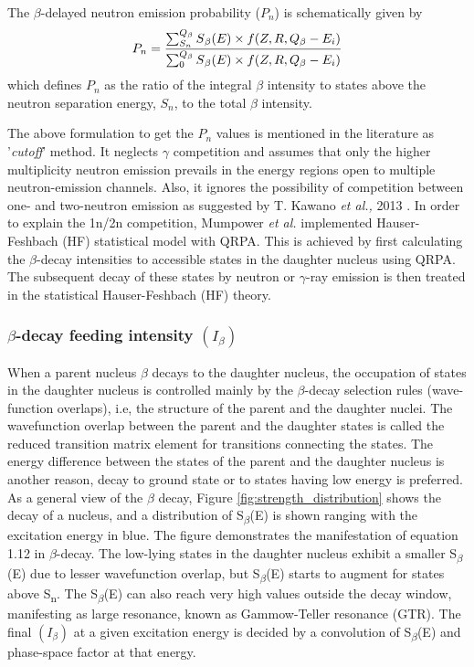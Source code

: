 The $\beta$-delayed neutron emission probability ($P_{n}$) is schematically given by 
\begin{equation}
P_{n}=\frac{\sum_{S_{n}}^{Q_{\beta}} S\textsubscript{$\beta$}(E)\times f(Z,R,Q_{\beta}-E_{i})}{\sum_{0}^{Q_{\beta}} S\textsubscript{$\beta$}(E)\times f(Z,R,Q_{\beta}-E_{i})}
\end{equation}
which defines $P_{n}$ as the ratio of the integral $\beta$ intensity to states above the neutron separation energy, $S_{n}$, to the total $\beta$ intensity. 

The above formulation to get the $P_{n}$ values is mentioned in the literature as '\textit{cutoff}' method. It neglects $\gamma$ competition and assumes that only the higher multiplicity neutron emission prevails in the energy regions open to multiple neutron-emission channels. Also, it ignores the possibility of competition between one- and two-neutron emission as suggested by T. Kawano \textit{et al.,} 2013 \citep{kwano2013}. In order to explain the 1n/2n competition, Mumpower \textit{et al.} \citep{moller2016} implemented Hauser-Feshbach (HF) statistical model with QRPA. This is achieved by first calculating the $\beta$-decay intensities to accessible states in the daughter nucleus using QRPA. The subsequent decay of these states by neutron or $\gamma$-ray emission is then treated in the statistical Hauser-Feshbach (HF) theory. 


\subsubsection{$\beta$-decay feeding intensity $(I_{\beta})$}
When a parent nucleus $\beta$ decays to the daughter nucleus, the occupation of states in the daughter nucleus is controlled mainly by the $\beta$-decay selection rules (wave-function overlaps), i.e, the structure of the parent and the daughter nuclei. The wavefunction overlap between the parent and the daughter states is called the reduced transition matrix element for transitions connecting the states. The energy difference between the states of the parent and the daughter nucleus is another reason, decay to ground state or to states having low energy is preferred. As a general view of the $\beta$ decay, Figure \ref{fig:strength_distribution} shows the decay of a nucleus, and a distribution of S\textsubscript{$\beta$}(E) is shown ranging with the excitation energy in blue. The figure demonstrates the manifestation of equation 1.12 in $\beta$-decay. The low-lying states in the daughter nucleus exhibit a smaller S\textsubscript{$\beta$}(E) due to lesser wavefunction overlap, but S\textsubscript{$\beta$}(E) starts to augment for states above S\textsubscript{n}. The S\textsubscript{$\beta$}(E) can also reach very high values outside the decay window, manifesting as large resonance, known as Gammow-Teller resonance (GTR). The final $(I_{\beta})$ at a given excitation energy is decided by a convolution of S\textsubscript{$\beta$}(E) and phase-space factor at that energy.



